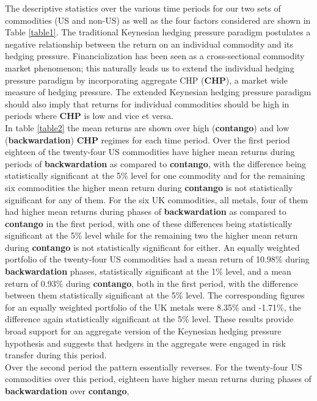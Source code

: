 \documentclass[]{elsarticle} %
\begin{document}
The descriptive statistics over the various time periods for our two
sets of commodities (US and non-US) as well as the four factors
considered are shown in Table \ref{table1}. The traditional Keynesian
hedging pressure paradigm postulates a negative relationship between the
return on an individual commodity and its hedging pressure.
Financialization has been seen as a cross-sectional commodity market
phenomenon; this naturally leads us to extend the individual hedging
pressure paradigm by incorporating aggregate CHP (\textbf{CHP}), a
market wide measure of hedging pressure. The extended Keynesian hedging
pressure paradigm should also imply that returns for individual
commodities should be high in periods where \textbf{CHP} is low and vice
et versa.\\
In table \ref{table2} the mean returns are shown over high
(\textbf{contango}) and low (\textbf{backwardation}) \textbf{CHP}
regimes for each time period. Over the first period eighteen of the
twenty-four US commodities have higher mean returns during periods of
\textbf{backwardation} as compared to \textbf{contango}, with the
difference being statistically significant at the 5\% level for one
commodity and for the remaining six commodities the higher mean return
during \textbf{contango} is not statistically significant for any of
them. For the six UK commodities, all metals, four of them had higher
mean returns during phases of \textbf{backwardation} as compared to
\textbf{contango} in the first period, with one of these differences
being statistically significant at the 5\% level while for the remaining
two the higher mean return during \textbf{contango} is not statistically
significant for either. An equally weighted portfolio of the twenty-four
US commodities had a mean return of 10.98\% during
\textbf{backwardation} phases, statistically significant at the 1\%
level, and a mean return of 0.93\% during \textbf{contango}, both in the
first period, with the difference between them statistically significant
at the 5\% level. The corresponding figures for an equally weighted
portfolio of the UK metals were 8.35\% and -1.71\%, the difference again
statistically significant at the 5\% level. These results provide broad
support for an aggregate version of the Keynesian hedging pressure
hypothesis and suggests that hedgers in the aggregate were engaged in
risk transfer during this period.\\
Over the second period the pattern essentially reverses. For the
twenty-four US commodities over this period, eighteen have higher mean
returns during phases of \textbf{backwardation} over \textbf{contango},
\end{document}

